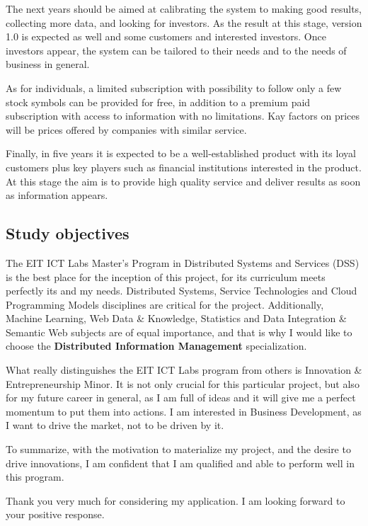 \documentclass[a4paper,12pt]{article}
\begin{document}
The next years should be aimed at calibrating the system to making good results, collecting more data, and looking for investors. As the result at this stage, version 1.0 is expected as well and some customers and interested investors. Once investors appear, the system can be tailored to their needs and to the needs of business in general.

As for individuals, a limited subscription with possibility to follow only a few stock symbols can be provided for free, in addition to a premium paid subscription with access to information with no limitations. Kay factors on prices will be prices offered by companies with similar service. 

Finally, in five years it is expected to be a well-established product with its loyal customers plus key players such as financial institutions interested in the product. At this stage the aim is to provide high quality service and deliver results as soon as information appears.

\subsection*{Study objectives}

The EIT ICT Labs Master's Program in Distributed Systems and Services (DSS) is the best place for the inception of this project, for its curriculum meets perfectly its and my needs. Distributed Systems, Service Technologies and Cloud Programming Models disciplines are critical for the project. Additionally, Machine Learning, Web Data \& Knowledge, Statistics and Data Integration \& Semantic Web subjects are of equal importance, and that is why I would like to choose the \textbf{Distributed Information Management} specialization. 

What really distinguishes the EIT ICT Labs program from others is Innovation \& Entrepreneurship Minor. It is not only crucial for this particular project, but also for my future career in general, as I am full of ideas and it will give me a perfect momentum to put them into actions. I am interested in Business Development, as I want to drive the market, not to be driven by it. 

To summarize, with the motivation to materialize my project, and the desire to drive innovations, I am confident that I am qualified and able to perform well in this program.

Thank you very much for considering my application. I am looking forward to your positive response.
\end{document}
